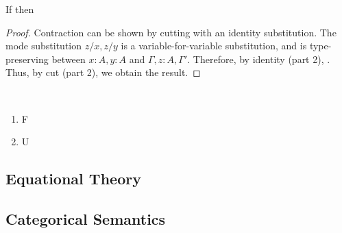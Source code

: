 \begin{theorem}
\item If
then
\end{theorem}

\begin{proof}  Contraction can be shown by cutting with an identity substitution.
The mode substitution $z/x,z/y$ is a variable-for-variable substitution,
and is type-preserving between ${x:A,y:A}$ and ${\Gamma,z:A,\Gamma'}$.
Therefore, by identity (part 2),
.  Thus, by cut (part 2), we
obtain the result.
\end{proof}

\begin{theorem}[Fusion] ~
\begin{enumerate} 
\item F
\item U
\end{enumerate}
\end{theorem}

\subsection{Equational Theory}

\subsection{Categorical Semantics}

